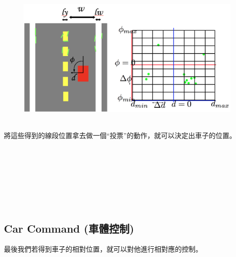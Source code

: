 \documentclass{article}
\begin{document}
\begin{figure}[htp]
    \begin{center}
        \includegraphics[width=400pt]{pic/3_3_2.png}
    \end{center}
\end{figure}
\\
將這些得到的線段位置拿去做一個“投票”的動作，就可以決定出車子的位置。
\\\\\\\\\\\\\\\\
\subsection{Car Command (車體控制)}
最後我們若得到車子的相對位置，就可以對他進行相對應的控制。
\end{document}
